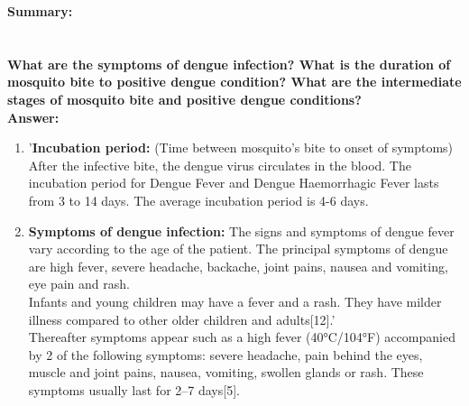 \documentclass[11pt]{exam}
\begin{document}
\begin{questions}
\textbf{Summary:} \\
\\ \\

\newpage
\question
\label{7. Nucleation }
\textbf{What are the symptoms of dengue infection? What is the duration of mosquito bite to positive dengue condition? What are the intermediate stages of mosquito bite and positive dengue conditions?}\\
\textbf{Answer:} \\
\begin{enumerate}
\item '\textbf{Incubation period:} (Time between mosquito’s bite to onset of symptoms)
After the infective bite, the dengue virus circulates in the blood. The incubation period for Dengue Fever and Dengue Haemorrhagic Fever lasts
from 3 to 14 days. The average incubation period is 4-6 days. \\
\item \textbf{Symptoms of dengue infection:} The signs and symptoms of dengue fever vary according to the age of the patient.
The principal symptoms of dengue are high fever, severe headache, backache,
joint pains, nausea and vomiting, eye pain and rash.\\
Infants and young children may have a fever and a rash. They have milder illness
compared to other older children and adults[12].'\\
Thereafter symptoms appear such as a high fever (40°C/104°F) accompanied by 2 of the following symptoms: severe headache, pain behind the eyes, muscle and joint pains, nausea, vomiting, swollen glands or rash. These symptoms usually last for 2–7 days[5].\\


\end{enumerate}
\end{questions}
\end{document}
